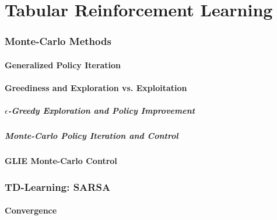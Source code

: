 \chapter{Tabular Reinforcement Learning} %

        \subsection{Monte-Carlo Methods} %

            \subsubsection{Generalized Policy Iteration} %

            \subsubsection{Greediness and Exploration vs. Exploitation} %

                \paragraph{\(\epsilon\)-Greedy Exploration and Policy Improvement} %

                \paragraph{Monte-Carlo Policy Iteration and Control} %

            \subsubsection{GLIE Monte-Carlo Control} %

        \subsection{TD-Learning: SARSA} %

            \subsubsection{Convergence} %

